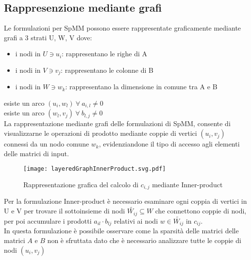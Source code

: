 \subsection{Rappresenzione mediante grafi}
Le formulazioni per SpMM possono essere rappresentate graficamente mediante
grafi a 3 strati U, W, V \cite{2dNewIdeas,cohen3LayeredGraphs} dove:
\begin{itemize}
  \item i nodi in $U \ni u_i$:   rappresentano le righe di A
  \item i nodi in $V \ni v_j$:   rappresentano le colonne di B
  \item i nodi in $W \ni w_k$:   rappresentano la dimensione in comune tra A e B
\end{itemize}
esiste un arco $(u_i,w_l) ~ \forall ~ a_{i,l} \neq 0$\\
esiste un arco $(w_l,v_j) ~ \forall ~ b_{l,j} \neq 0$\\
La rappresentazione mediante grafi delle formulazioni di SpMM, consente di visualizzarne le operazioni di prodotto
mediante coppie di vertici $(u_i,v_j)$ connessi da un nodo comune $w_k$,
evidenziandone il tipo di accesso agli elementi delle matrici di input.\\
\begin{figure}[H]
  \centering \texttt{[image: layeredGraphInnerProduct.svg.pdf]} 
  \caption[grafo rappresentativo formulazione Inner-Product]
  {Rappresentazione grafica del calcolo di $c_{i,j}$ mediante Inner-product}
  \decoRule \label{fig:layeredGraphInnerProduct}
\end{figure}
Per la formulazione Inner-product %
è necessario esaminare ogni coppia di vertici  in U e V per trovare 
il sottoinsieme di nodi $\tilde{W_{ij}} \subseteq W$ che connettono coppie di nodi,
per poi accumulare i prodotti $a_{il} \cdot b_{lj}$ relativi ai nodi $w\in \tilde{W_{ij}}$ in $c_{ij}$.\\
In questa formulazione è possibile osservare come la sparsità delle matrici delle matrici $A$ e $B$ non è sfruttata 
dato che è necessario analizzare tutte le coppie di nodi $(u_i,v_j)$\\
